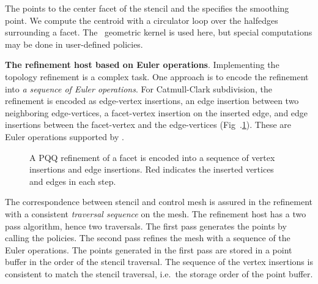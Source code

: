 \noindent
The  points to the center facet of the stencil and the
 specifies the smoothing point. We compute the centroid
with a circulator loop over the halfedges surrounding a facet. The
\cgal\ geometric kernel is used here, but special computations may be
done in user-defined policies.

 
\noindent\textbf{The refinement host based on Euler operations}.
Implementing the topology refinement is a complex task. One
approach is to encode the refinement into \emph{a sequence of Euler
operations}. For Catmull-Clark subdivision, the refinement is encoded
as edge-vertex insertions, an edge insertion between two neighboring
edge-vertices, a facet-vertex insertion on the inserted edge, and 
edge insertions between the facet-vertex and the edge-vertices 
(Fig~.\ref{fig:CCRefinement}). These are Euler operations supported 
by \cgalpoly.
\begin{figure}
  \centering
  \caption{A PQQ refinement of a facet is encoded into a sequence of
  vertex insertions and edge insertions. Red indicates the inserted
  vertices and edges in each step.}
  \label{fig:CCRefinement}\vspace*{-2mm}
\end{figure}

The correspondence between stencil and control mesh is assured in the
refinement with a consistent \emph{traversal sequence\/} on the mesh.
The refinement host has a two pass algorithm, hence two traversals.
The first pass generates the points by calling the policies. The
second pass refines the mesh with a sequence of the Euler operations.
The points generated in the first pass are stored in a point buffer in
the order of the stencil traversal. The sequence of the vertex
insertions is consistent to match the stencil traversal, i.e.\ the
storage order of the point buffer.

